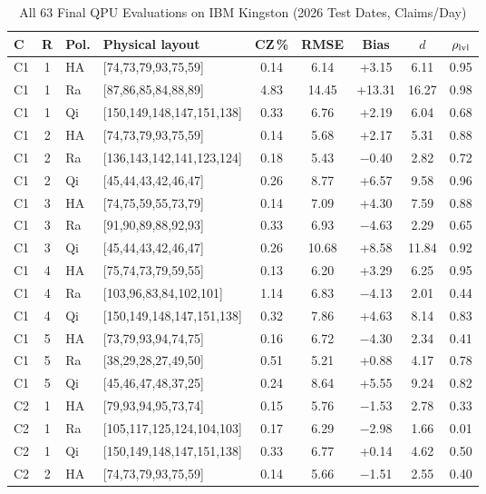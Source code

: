 \documentclass[journal]{IEEEtran}
\begin{document}
\begin{table}[t]
\centering
\caption{All 63 Final QPU Evaluations on IBM Kingston (2026 Test Dates, Claims/Day)}
\label{tab:allruns}
\scriptsize
\setlength{\tabcolsep}{2.5pt}
\begin{tabular}[t]{@{}lclp{2.75cm}ccccc@{}}
\toprule
C & R & Pol. & Physical layout & CZ\,\% & RMSE & Bias & $d$ & $\rho_{\rm lvl}$ \\
\midrule
C1 & 1 & HA & [74,73,79,93,75,59] & 0.14 & 6.14 & +3.15 & 6.11 & 0.95 \\
C1 & 1 & Ra & [87,86,85,84,88,89] & 4.83 & 14.45 & +13.31 & 16.27 & 0.98 \\
C1 & 1 & Qi & [150,149,148,147,151,138] & 0.33 & 6.76 & +2.19 & 6.04 & 0.68 \\
C1 & 2 & HA & [74,73,79,93,75,59] & 0.14 & 5.68 & +2.17 & 5.31 & 0.88 \\
C1 & 2 & Ra & [136,143,142,141,123,124] & 0.18 & 5.43 & $-$0.40 & 2.82 & 0.72 \\
C1 & 2 & Qi & [45,44,43,42,46,47] & 0.26 & 8.77 & +6.57 & 9.58 & 0.96 \\
C1 & 3 & HA & [74,75,59,55,73,79] & 0.14 & 7.09 & +4.30 & 7.59 & 0.88 \\
C1 & 3 & Ra & [91,90,89,88,92,93] & 0.33 & 6.93 & $-$4.63 & 2.29 & 0.65 \\
C1 & 3 & Qi & [45,44,43,42,46,47] & 0.26 & 10.68 & +8.58 & 11.84 & 0.92 \\
C1 & 4 & HA & [75,74,73,79,59,55] & 0.13 & 6.20 & +3.29 & 6.25 & 0.95 \\
C1 & 4 & Ra & [103,96,83,84,102,101] & 1.14 & 6.83 & $-$4.13 & 2.01 & 0.44 \\
C1 & 4 & Qi & [150,149,148,147,151,138] & 0.32 & 7.86 & +4.63 & 8.14 & 0.83 \\
C1 & 5 & HA & [73,79,93,94,74,75] & 0.16 & 6.72 & $-$4.30 & 2.34 & 0.41 \\
C1 & 5 & Ra & [38,29,28,27,49,50] & 0.51 & 5.21 & +0.88 & 4.17 & 0.78 \\
C1 & 5 & Qi & [45,46,47,48,37,25] & 0.24 & 8.64 & +5.55 & 9.24 & 0.82 \\
C2 & 1 & HA & [79,93,94,95,73,74] & 0.15 & 5.76 & $-$1.53 & 2.78 & 0.33 \\
C2 & 1 & Ra & [105,117,125,124,104,103] & 0.17 & 6.29 & $-$2.98 & 1.66 & 0.01 \\
C2 & 1 & Qi & [150,149,148,147,151,138] & 0.33 & 6.77 & +0.14 & 4.62 & 0.50 \\
C2 & 2 & HA & [74,73,79,93,75,59] & 0.14 & 5.66 & $-$1.51 & 2.55 & 0.40 \\

\end{tabular}
\end{table}
\end{document}
